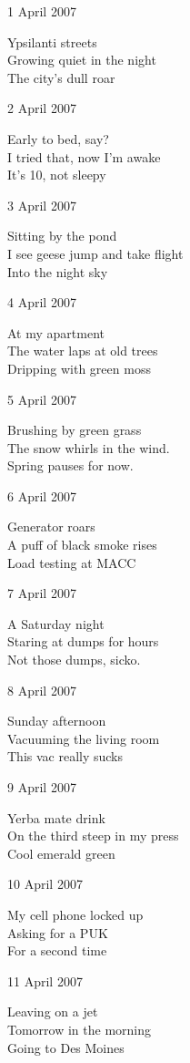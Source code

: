 \documentclass[12pt]{article}
\begin{document}
1 April 2007

Ypsilanti streets \\
Growing quiet in the night \\
The city's dull roar

2 April 2007

Early to bed, say? \\
I tried that, now I'm awake \\
It's 10, not sleepy

3 April 2007

Sitting by the pond \\
I see geese jump and take flight \\
Into the night sky

4 April 2007

At my apartment \\
The water laps at old trees \\
Dripping with green moss


\newpage

5 April 2007

Brushing by green grass \\
The snow whirls in the wind. \\
Spring pauses for now.

6 April 2007

Generator roars \\
A puff of black smoke rises \\
Load testing at MACC

7 April 2007

A Saturday night \\
Staring at dumps for hours \\
Not those dumps, sicko.

8 April 2007

Sunday afternoon \\
Vacuuming the living room \\
This vac really sucks

9 April 2007

Yerba mate drink \\
On the third steep in my press \\
Cool emerald green

10 April 2007

My cell phone locked up \\
Asking for a PUK \\
For a second time

11 April 2007

Leaving on a jet \\
Tomorrow in the morning \\
Going to Des Moines
\end{document}

